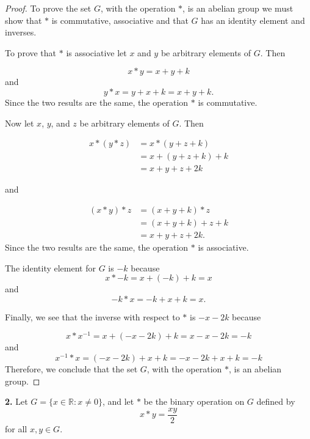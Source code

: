 \documentclass[12pt]{article}   %
\begin{document}
\begin{proof}
To prove the set $G$, with the operation $\ast$, is an abelian group we must show that $\ast$ is commutative, associative and that $G$ has an identity element and inverses.

To prove that $*$ is associative let $x$ and $y$ be arbitrary elements of $G$. Then

\begin{equation*}
x * y = x + y + k
\end{equation*}
and
\[
y * x = y + x + k = x + y + k.
\]
Since the two results are the same, the operation $\ast$ is commutative.

Now let $x$, $y$, and $z$ be arbitrary elements of $G$. Then

\begin{align*}
x * (y * z) &= x * (y + z + k) \\
&= x + (y + z + k) + k \\
&= x + y + z + 2k
\end{align*}

and

\begin{align*}
(x * y) * z &= (x + y + k) * z \\
&= (x + y + k) + z + k \\
&= x + y + z + 2k.
\end{align*}
Since the two results are the same, the operation $*$ is associative.


The identity element for $G$ is $-k$ because
\begin{equation*}
x * -k = x + (-k) + k = x
\end{equation*}
and
\begin{equation*}
-k * x = -k + x + k = x.
\end{equation*}

Finally, we see that the inverse with respect to $*$ is $-x - 2k$ because

\begin{equation*}
x * x^{-1} = x + (-x - 2k) + k = x - x - 2k = -k
\end{equation*}
and
\begin{equation*}
x^{-1} * x = (-x - 2k) + x + k = -x - 2k + x + k = -k
\end{equation*}
Therefore, we conclude that the set $G$, with the operation $\ast$, is an abelian group.
\end{proof}


\noindent\textbf{2.} \quad Let $G = \{x \in \mathbb{R}: x \neq 0\}$, and let $\ast$ be the binary operation on $G$ defined by
\begin{equation}
x * y = \frac{xy}{2}
\end{equation}
for all $x, y \in G$.
\end{document}
